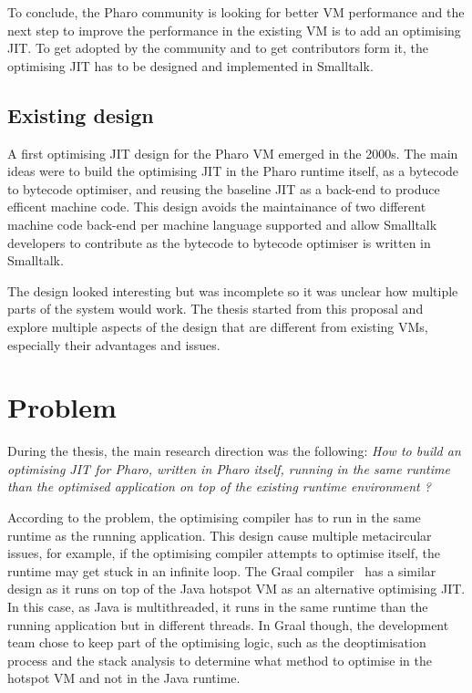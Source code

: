 \documentclass[a4paper,12pt,twoside]{../includes/ThesisStyle}
\begin{document}
To conclude, the Pharo community is looking for better VM performance and the next step to improve the performance in the existing VM is to add an optimising JIT. To get adopted by the community and to get contributors form it, the optimising JIT has to be designed and implemented in Smalltalk.

\subsection{Existing design}

A first optimising JIT design for the Pharo VM emerged in the 2000s. The main ideas were to build the optimising JIT in the Pharo runtime itself, as a bytecode to bytecode optimiser, and reusing the baseline JIT as a back-end to produce efficent machine code. This design avoids the maintainance of two different machine code back-end per machine language supported and allow Smalltalk developers to contribute as the bytecode to bytecode optimiser is written in Smalltalk.

The design looked interesting but was incomplete so it was unclear how multiple parts of the system would work. The thesis started from this proposal and explore multiple aspects of the design that are different from existing VMs, especially their advantages and issues.

\section{Problem}

During the thesis, the main research direction was the following:
\emph{How to build an optimising JIT for Pharo, written in Pharo itself, running in the same runtime than the optimised application on top of the existing runtime environment ?} 

According to the problem, the optimising compiler has to run in the same runtime as the running application. This design cause multiple metacircular issues, for example, if the optimising compiler attempts to optimise itself, the runtime may get stuck in an infinite loop. The Graal compiler~\cite{Dubo13c} has a similar design as it runs on top of the Java hotspot VM as an alternative optimising JIT. In this case, as Java is multithreaded, it runs in the same runtime than the running application but in different threads. In Graal though, the development team chose to keep part of the optimising logic, such as the deoptimisation process and the stack analysis to determine what method to optimise in the hotspot VM and not in the Java runtime. 
\end{document}
